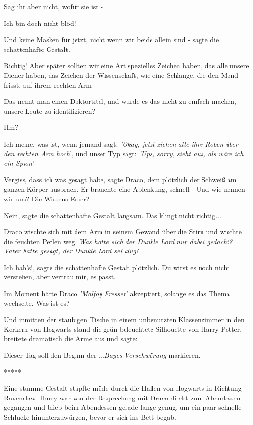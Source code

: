 \glqq{}Sag ihr aber nicht, wofür sie ist -\grqq{}

\glqq{}Ich bin doch nicht blöd!\grqq{}

\glqq{}Und keine Masken für jetzt, nicht wenn wir beide allein sind -\grqq{}
sagte die schattenhafte Gestalt.

\glqq{}Richtig! Aber später sollten wir eine Art spezielles Zeichen haben, das
alle unsere Diener haben, das Zeichen der Wissenschaft, wie eine Schlange, die
den Mond frisst, auf ihrem rechten Arm -\grqq{}

\glqq{}Das nennt man einen Doktortitel, und würde es das nicht zu einfach machen,
unsere Leute zu identifizieren?\grqq{}

\glqq{}Hm?\grqq{}

\glqq{}Ich meine, was ist, wenn jemand sagt: \emph{'Okay, jetzt ziehen alle ihre
Roben über den rechten Arm hoch}', und unser Typ sagt: \emph{'Ups, sorry, sieht
aus, als wäre ich ein Spion'} -\grqq{}

\glqq{}Vergiss, dass ich was gesagt habe\grqq{}, sagte Draco, dem plötzlich der
Schweiß am ganzen Körper ausbrach. Er brauchte eine Ablenkung, schnell - \glqq{}
Und wie nennen wir uns? Die Wissens-Esser?\grqq{}

\glqq{}Nein\grqq{}, sagte die schattenhafte Gestalt langsam. \glqq{}Das klingt
nicht richtig...\grqq{}

Draco wischte sich mit dem Arm in seinem Gewand über die Stirn und wischte die
feuchten Perlen weg. \emph{Was hatte sich der Dunkle Lord nur dabei gedacht?
Vater hatte gesagt, der Dunkle Lord sei klug!}

\glqq{}Ich hab's!\grqq{}, sagte die schattenhafte Gestalt plötzlich. \glqq{}Du
wirst es noch nicht verstehen, aber vertrau mir, es passt.\grqq{}

Im Moment hätte Draco \emph{'Malfoy Fresser'} akzeptiert, solange es das Thema
wechselte. \glqq{}Was ist es?\grqq{}

Und inmitten der staubigen Tische in einem unbenutzten Klassenzimmer in den
Kerkern von Hogwarts stand die grün beleuchtete Silhouette von Harry Potter,
breitete dramatisch die Arme aus und sagte:

\glqq{}Dieser Tag soll den Beginn der ...\emph{Bayes-Verschwörung}
markieren.\grqq{}

\begin{center}*****\end{center}

Eine stumme Gestalt stapfte müde durch die Hallen von Hogwarts in Richtung
Ravenclaw. Harry war von der Besprechung mit Draco direkt zum Abendessen
gegangen und blieb beim Abendessen gerade lange genug, um ein paar schnelle
Schlucke hinunterzuwürgen, bevor er sich ins Bett begab.

